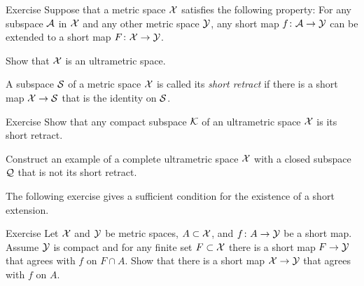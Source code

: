 \begin{thm}{Exercise}\label{ex:ultrametric}
Suppose that a metric space $\mathcal{X}$ satisfies the following property:
For any subspace $\mathcal{A}$ in $\mathcal{X}$ and any other metric space $\mathcal{Y}$, any short map $f\colon\mathcal{A}\to \mathcal{Y}$ can be extended to a short map $F\colon\mathcal{X}\to \mathcal{Y}$.

Show that $\mathcal{X}$ is an ultrametric space.
\end{thm}

A subspace $\mathcal{S}$ of a metric space $\mathcal{X}$ is called its \emph{short retract} if there is a short map $\mathcal{X}\to \mathcal{S}$ that is the identity on $\mathcal{S}$.

\begin{thm}{Exercise}\label{ex:ultrametric-converse}
Show that any compact subspace $\mathcal{K}$ of an ultrametric space $\mathcal{X}$ is its short retract.

Construct an example of a complete ultrametric space $\mathcal{X}$ with a closed subspace $\mathcal{Q}$ that is not its short retract.
\end{thm}

The following exercise gives a sufficient condition for the existence of a short extension.

\begin{thm}{Exercise}\label{ex:petrunin-stadler}
Let $\mathcal{X}$ and $\mathcal{Y}$ be metric spaces, $A\subset \mathcal{X}$, and $f\:A\z\to \spc{Y}$ be a short map.
Assume $\mathcal{Y}$ is compact and for any finite set $F\subset \mathcal{X}$ there is a short map $F\to \mathcal{Y}$ that agrees with $f$ on $F\cap A$.
Show that there is a short map $\mathcal{X}\to \mathcal{Y}$ that agrees with $f$ on $A$.
\end{thm}
